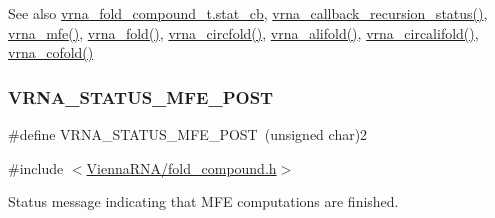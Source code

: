 \begin{DoxySeeAlso}{See also}
\mbox{\hyperlink{group__fold__compound_a87a83f6795b569000efcbe65acc3dd81}{vrna\+\_\+fold\+\_\+compound\+\_\+t.\+stat\+\_\+cb}}, \mbox{\hyperlink{group__fold__compound_gac86036fa8cad1108832335063243cdc8}{vrna\+\_\+callback\+\_\+recursion\+\_\+status()}}, \mbox{\hyperlink{group__mfe__fold_gabd3b147371ccf25c577f88bbbaf159fd}{vrna\+\_\+mfe()}}, \mbox{\hyperlink{group__mfe__fold__single_ga29a33b2895f4e67b0480271ff289afdc}{vrna\+\_\+fold()}}, \mbox{\hyperlink{group__mfe__fold__single_gaf973483d8acbc8cc9aacfc8a9b7f0074}{vrna\+\_\+circfold()}}, \mbox{\hyperlink{group__consensus__mfe__fold_ga6c9d3bef3e92c6d423ffac9f981418c1}{vrna\+\_\+alifold()}}, \mbox{\hyperlink{group__consensus__mfe__fold_ga17a1be7490468c29c335ba9bffacba53}{vrna\+\_\+circalifold()}}, \mbox{\hyperlink{group__mfe__cofold_ga9ef3a297201dbf838a8daff2b45c0c82}{vrna\+\_\+cofold()}} 
\end{DoxySeeAlso}
\mbox{\label{group__fold__compound_ga47c900ca76e56e59e2e83a06e0bde641}} 
\subsubsection{\texorpdfstring{V\+R\+N\+A\+\_\+\+S\+T\+A\+T\+U\+S\+\_\+\+M\+F\+E\+\_\+\+P\+O\+ST}{VRNA\_STATUS\_MFE\_POST}}
{\footnotesize\ttfamily \#define V\+R\+N\+A\+\_\+\+S\+T\+A\+T\+U\+S\+\_\+\+M\+F\+E\+\_\+\+P\+O\+ST~(unsigned char)2}



{\ttfamily \#include $<$\mbox{\hyperlink{fold__compound_8h}{Vienna\+R\+N\+A/fold\+\_\+compound.\+h}}$>$}



Status message indicating that M\+FE computations are finished. 

